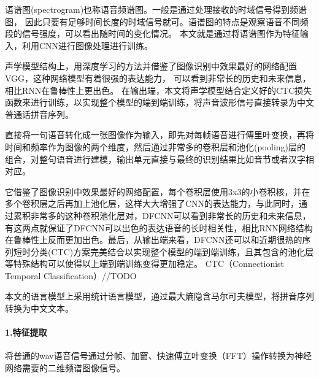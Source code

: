\documentclass[12pt,a4paper,fancyhdr,openany,oneside]{ctexbook}
\begin{document}
语谱图(spectrogram)也称语音频谱图。一般是通过处理接收的时域信号得到频谱图，
因此只要有足够时间长度的时域信号就可。语谱图的特点是观察语音不同频段的信号强度，可以看出随时间的变化情况。
本文就是通过将语谱图作为特征输入，利用CNN进行图像处理进行训练。

声学模型结构上，用深度学习的方法并借鉴了图像识别中效果最好的网络配置VGG，这种网络模型有着很强的表达能力，
可以看到非常长的历史和未来信息，相比RNN在鲁棒性上更出色。
在输出端，本文将声学模型结合定义好的CTC损失函数来进行训练，以实现整个模型的端到端训练，将声音波形信号直接转录为中文
普通话拼音序列。

直接将一句语音转化成一张图像作为输入，即先对每帧语音进行傅里叶变换，再将时间和频率作为图像的两个维度，然后通过非常多的卷积层和池化(pooling)层的组合，对整句语音进行建模，输出单元直接与最终的识别结果比如音节或者汉字相对应。

它借鉴了图像识别中效果最好的网络配置，每个卷积层使用3x3的小卷积核，并在多个卷积层之后再加上池化层，这样大大增强了CNN的表达能力，与此同时，通过累积非常多的这种卷积池化层对，DFCNN可以看到非常长的历史和未来信息，有这两点就保证了DFCNN可以出色的表达语音的长时相关性，相比RNN网络结构在鲁棒性上反而更加出色。最后，从输出端来看，DFCNN还可以和近期很热的序列短时分类(CTC)方案完美结合以实现整个模型的端到端训练，且其包含的池化层等特殊结构可以使得以上端到端训练变得更加稳定。
CTC（Connectionist Temporal Classiﬁcation）//TODO


本文的语言模型上采用统计语言模型，通过最大熵隐含马尔可夫模型，将拼音序列转换为中文文本。


\paragraph{1.特征提取} 将普通的wav语音信号通过分帧、加窗、快速傅立叶变换（FFT）操作转换为神经网络需要的二维频谱图像信号。
\end{document}
